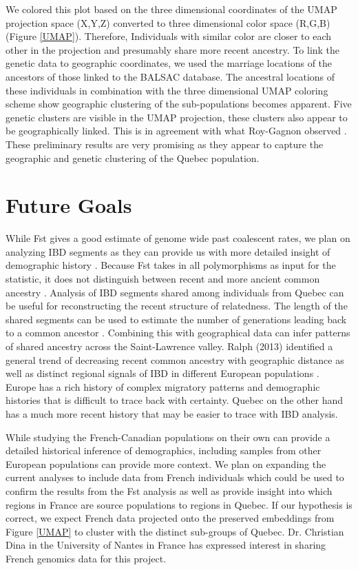 \documentclass[
11pt, %
oneside, %
english, %
doublespacing, %
headsepline, %
chapterinoneline, %
]{MastersDoctoralThesis} %
\begin{document}
We colored this plot based on the three dimensional coordinates of the UMAP projection space (X,Y,Z) converted to three dimensional color space (R,G,B) (Figure \ref{UMAP}).
Therefore, Individuals with similar color are closer to each other in the projection and presumably share more recent ancestry.
To link the genetic data to geographic coordinates, we used the marriage locations of the ancestors of those linked to the BALSAC database.
The ancestral locations of these individuals in combination with the three dimensional UMAP coloring scheme show geographic clustering of the sub-populations becomes apparent.
Five genetic clusters are visible in the UMAP projection, these clusters also appear to be geographically linked.
This is in agreement with what Roy-Gagnon observed \citep{Roy-Gagnon2011}.
These preliminary results are very promising as they appear to capture the geographic and genetic clustering of the Quebec population.

\section{Future Goals}
While Fst gives a good estimate of genome wide past coalescent rates, we plan on analyzing IBD segments as they can provide us with more detailed insight of demographic history \citep{Charlesworth2003, Ralph2013, Baharian2016}.
Because Fst takes in all polymorphisms as input for the statistic, it does not distinguish between recent and more ancient common ancestry \citep{Ralph2013}.
Analysis of IBD segments shared among individuals from Quebec can be useful for reconstructing the recent structure of relatedness.
The length of the shared segments can be used to estimate the number of generations leading back to a common ancestor \citep{Palamara2015,Campbell2012,Baharian2016}.
Combining this with geographical data can infer patterns of shared ancestry across the Saint-Lawrence valley.
Ralph (2013) identified a general trend of decreasing recent common ancestry with geographic distance as well as distinct regional signals of IBD in different European populations \citep{Ralph2013}.
Europe has a rich history of complex migratory patterns and demographic histories that is difficult to trace back with certainty. 
Quebec on the other hand has a much more recent history that may be easier to trace with IBD analysis.

While studying the French-Canadian populations on their own can provide a detailed historical inference of demographics, including samples from other European populations can provide more context.
We plan on expanding the current analyses to include data from French individuals which could be used to confirm the results from the Fst analysis as well as provide insight into which regions in France are source populations to regions in Quebec.
If our hypothesis is correct, we expect French data projected onto the preserved embeddings from Figure \ref{UMAP} to cluster with the distinct sub-groups of Quebec.
Dr. Christian Dina in the University of Nantes in France has expressed interest in sharing French genomics data for this project.
\clearpage
\end{document}

